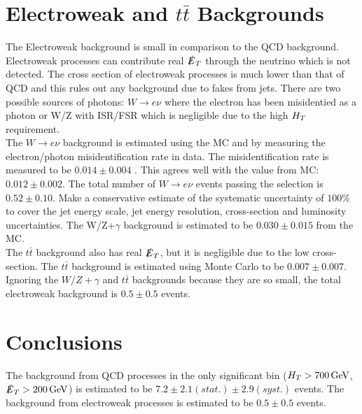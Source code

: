 \section{Electroweak and $t\bar{t}$ Backgrounds}

The Electroweak background is small in comparison to the QCD background.
Electroweak processes can contribute real $\slashed{E}_{T}$ through the neutrino which is 
not detected. The cross section of electroweak processes is much lower than
that of QCD and this rules out any background due to fakes from jets. There are
two possible sources of photons: $W\rightarrow e\nu$ where the electron has been
misidentied as a photon or W/Z with ISR/FSR which is negligible due to the high 
$H_{T}$ requirement. \\

The $W\rightarrow e\nu$ background is estimated using the MC and by measuring 
the electron/photon misidentification rate in data. The misidentification rate 
is measured to be $0.014\pm0.004$ \cite{ra3}. This agrees well with the value 
from MC: $0.012\pm0.002$. The total number of $W\rightarrow e\nu$ events passing 
the selection is $0.52\pm0.10$. Make a conservative estimate of the systematic 
uncertainty of $100\unit{\%}$ to cover the jet energy scale, jet energy 
resolution, cross-section and luminosity uncertainties. The W/Z+$\gamma$ 
background is estimated to be $0.030\pm0.015$ from the MC. \\

The $t\bar{t}$ background also has real $\slashed{E}_{T}$, but it is negligible due to the
low cross-section. The $t\bar{t}$ background is estimated using Monte Carlo to
be $0.007\pm0.007$. \\

Ignoring the $W/Z+\gamma$ and $t\bar{t}$ backgrounds because they are so small, 
the total electroweak background is $0.5\pm0.5$ events.
 
\section{Conclusions}

The background from QCD processes in the only significant bin
($H_{T}>700\, \mathrm{GeV}$, $\slashed{E}_{T}>200\, \mathrm{GeV}$) is estimated to be 
$7.2\pm2.1(stat.)\pm2.9(syst.)$ events. The background from electroweak
processes is estimated to be $0.5\pm0.5$ events.
